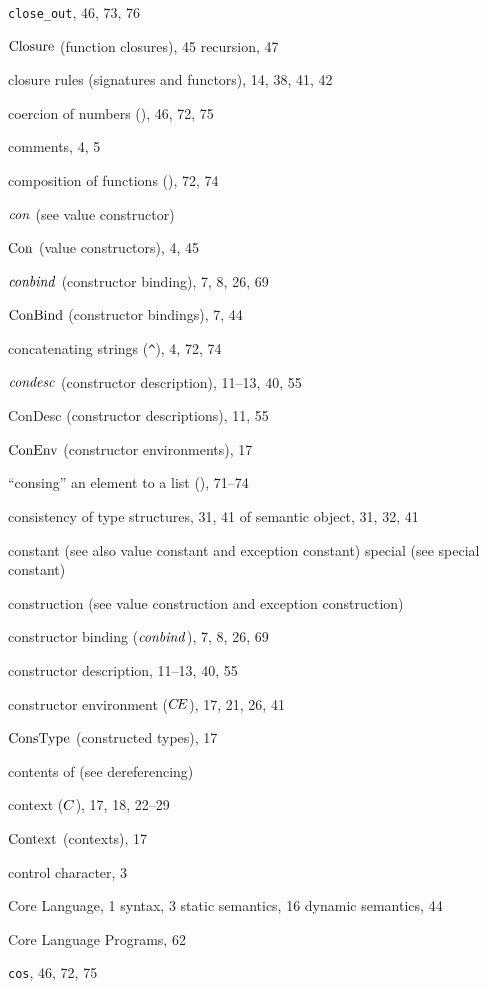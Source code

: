 \begin{theindex}
\item \verb+close_out+, 46, 73, 76
\item ${\rm Closure}$ (function closures), 45
\subitem recursion, 47
\item closure rules (signatures and functors), 14, 38, 41, 42
\item coercion of numbers (), 46, 72, 75
\item comments, 4, 5
\item composition of functions (), 72, 74
\item ${\it con}$ (see value constructor) 
\item ${\rm Con}$ (value constructors), 4, 45
\item ${\it conbind}$ (constructor binding), 7, 8, 26, 69
\item ${\rm ConBind}$ (constructor bindings), 7, 44
\item concatenating strings (\verb+^+), 4, 72, 74
\item ${\it condesc}$ (constructor description), 11--13, 40, 55
\item ConDesc (constructor descriptions), 11, 55
\item ${\rm ConEnv}$ (constructor environments), 17
\item ``consing'' an element to a list (\ml{::}), 71--74
\item consistency 
\subitem of type structures, 31, 41
\subitem of semantic object, 31, 32, 41
\item constant (see also value constant and exception constant) 
\subitem special (see special constant) 
\item construction (see value construction and  exception construction) 
\item constructor binding (${\it conbind}$), 7, 8, 26, 69
\item constructor description, 11--13, 40, 55
\item constructor environment ($\mbox{$C\!E$}$), 17, 21, 26, 41
\item ${\rm ConsType}$ (constructed types), 17
\item contents of (see dereferencing) 
\item context ($C$), 17, 18, 22--29
\item $\rm Context$ (contexts), 17
\item control character, 3
\item Core Language, 1
\subitem syntax, 3
\subitem static semantics, 16
\subitem dynamic semantics, 44
\item Core Language Programs, 62
\item {\tt cos}, 46, 72, 75

\end{theindex}
